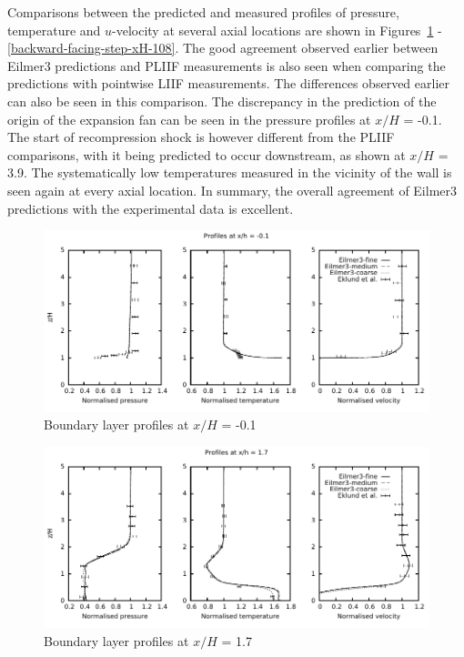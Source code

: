 Comparisons between the predicted and measured profiles of pressure, temperature
and $u$-velocity at several axial locations are shown in Figures~\ref{backward-facing-step-xH--01} - \ref{backward-facing-step-xH-108}.
The good agreement observed earlier between Eilmer3 predictions and PLIIF measurements
is also seen when comparing the predictions with pointwise LIIF measurements.
The differences observed earlier can also be seen in this comparison. 
The discrepancy in the prediction of the origin of the expansion fan can be seen in
the pressure profiles at $x/H$ = -0.1. The start of recompression shock is however 
different from the PLIIF comparisons, with it being predicted to occur downstream, 
as shown at $x/H$ = 3.9. The systematically low temperatures measured in the vicinity 
of the wall is seen again at every axial location. In summary, the overall agreement of 
Eilmer3 predictions with the experimental data is excellent.
%
\begin{figure}[h]
 \begin{center}
  \includegraphics[width=13.8cm]{./chap4-backward-facing-step/figs/xh_-01.pdf}
 \end{center}
 \caption{Boundary layer profiles at $x/H$ = -0.1}
 \label{backward-facing-step-xH--01}
\end{figure}
%
\begin{figure}[h]
 \begin{center}
  \includegraphics[width=13.8cm]{./chap4-backward-facing-step/figs/xh_17.pdf}
 \end{center}
 \caption{Boundary layer profiles at $x/H$ = 1.7}
 \label{backward-facing-step-xH-17}
\end{figure}
